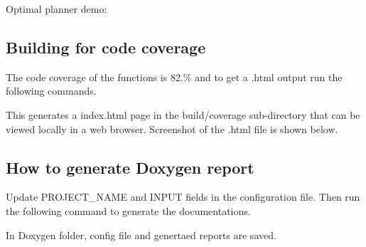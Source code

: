  


\begin{DoxyEnumerate}
\item Optimal planner demo\+:
\end{DoxyEnumerate}

 

\subsection*{Building for code coverage}

The code coverage of the functions is 82.\% and to get a .html output run the following commands. 
\begin{DoxyCode}{0}
\end{DoxyCode}
 This generates a index.\+html page in the build/coverage sub-\/directory that can be viewed locally in a web browser. Screenshot of the .html file is shown below.

 

\subsection*{How to generate Doxygen report}


\begin{DoxyCode}{0}
\end{DoxyCode}
 Update P\+R\+O\+J\+E\+C\+T\+\_\+\+N\+A\+ME and I\+N\+P\+UT fields in the configuration file. Then run the following command to generate the documentations. 
\begin{DoxyCode}{0}
\end{DoxyCode}
 In Doxygen folder, config file and genertaed reports are saved. 